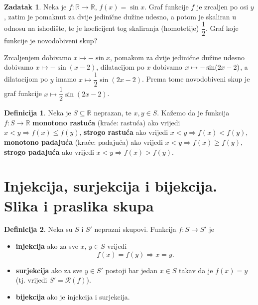 \documentclass{book}
\let\originalleft\left
\let\originalright\right
\renewcommand{\left}{\mathopen{}\mathclose\bgroup\originalleft}
\renewcommand{\right}{\aftergroup\egroup\originalright}
\renewenvironment{proof}{%
    \vspace{-\parskip}\begin{oldproof}%
    }{%
    \end{oldproof}%
}
\theoremstyle{definition}
\theoremstyle{definition}
\newtheorem{definition}{Definicija}
\newtheorem{exercise}{Zadatak}
\theoremstyle{remark}
\begin{document}
\begin{exercise} Neka je $f : \mathbb{R}\to \mathbb{R}$, $f(x)=\sin{x}$. Graf funkcije $f$ je zrcaljen po osi $y$, zatim je pomaknut za dvije jedinične dužine udesno, a potom je skaliran u odnosu na ishodište, te je koeficijent tog skaliranja (homotetije) $\dfrac{1}{2}$. Graf koje funkcije je novodobiveni skup?
\end{exercise}
\begin{proof}[Rješenje]
Zrcaljenjem dobivamo $x\mapsto -\sin{x}$, pomakom za dvije jedinične dužine udesno dobivamo $x\mapsto -\sin(x-2)$, dilatacijom po $x$ dobivamo $x\mapsto -\sin\left(2x-2\right)$, a dilatacijom po $y$ imamo $x\mapsto \dfrac{1}{2}\sin(2x-2)$. Prema tome novodobiveni skup je graf funkcije $x\mapsto \dfrac{1}{2}\sin(2x-2)$.
\end{proof}
\begin{definition}
\label{monotonic}
Neka je $S\subseteq \mathbb{R}$ neprazan, te $x, y\in S$. Kažemo da je funkcija $f : S\to \mathbb{R}$ \textbf{monotono rastuća} (kraće: rastuća) ako vrijedi $x<y\Rightarrow f(x)\leq f(y)$, \textbf{strogo rastuća} ako vrijedi $x<y\Rightarrow f(x)<f(y)$, \textbf{monotono padajuća} (kraće: padajuća) ako vrijedi $x<y\Rightarrow f(x)\geq f(y)$, \textbf{strogo padajuća} ako vrijedi $x<y\Rightarrow f(x)>f(y)$.
\end{definition}
\section{Injekcija, surjekcija i bijekcija. Slika i praslika skupa}

\begin{definition}
Neka su $S$ i $S'$ neprazni skupovi. Funkcija $f : S\to S'$ je
\begin{itemize}
\item \textbf{injekcija} ako za sve $x$, $y\in S$ vrijedi $$f(x)=f(y)\Rightarrow x=y.$$
\item \textbf{surjekcija} ako za sve $y\in S'$ postoji bar jedan $x\in S$ takav da je $f(x)=y$ (tj. vrijedi $S'=\mathcal{R}(f)$).
\item \textbf{bijekcija} ako je injekcija i surjekcija.
\end{itemize}
\end{definition}
\end{document}
